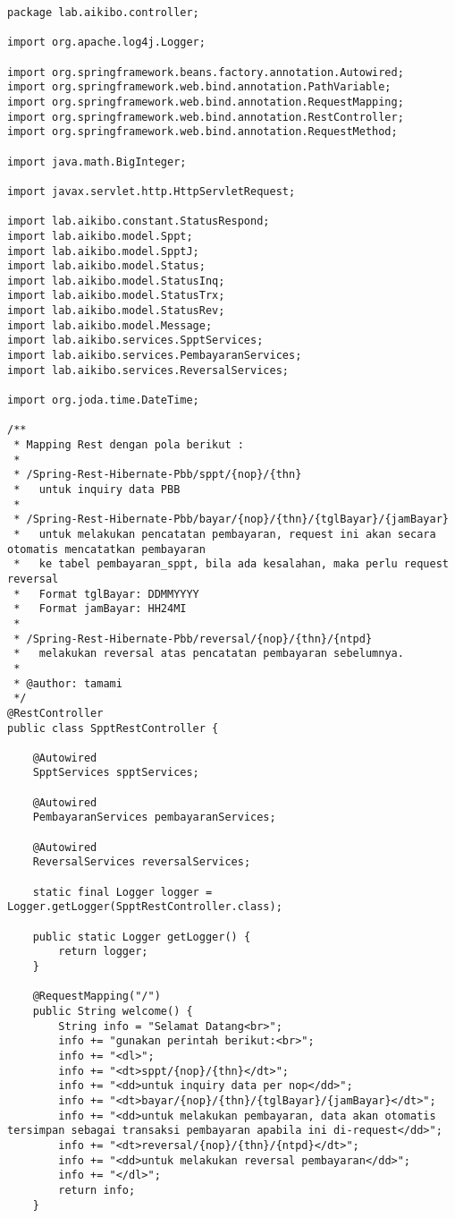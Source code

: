 \documentclass[pdftex,12pt, oneside]{article}
\begin{document}
\begin{lstlisting}
package lab.aikibo.controller;

import org.apache.log4j.Logger;

import org.springframework.beans.factory.annotation.Autowired;
import org.springframework.web.bind.annotation.PathVariable;
import org.springframework.web.bind.annotation.RequestMapping;
import org.springframework.web.bind.annotation.RestController;
import org.springframework.web.bind.annotation.RequestMethod;

import java.math.BigInteger;

import javax.servlet.http.HttpServletRequest;

import lab.aikibo.constant.StatusRespond;
import lab.aikibo.model.Sppt;
import lab.aikibo.model.SpptJ;
import lab.aikibo.model.Status;
import lab.aikibo.model.StatusInq;
import lab.aikibo.model.StatusTrx;
import lab.aikibo.model.StatusRev;
import lab.aikibo.model.Message;
import lab.aikibo.services.SpptServices;
import lab.aikibo.services.PembayaranServices;
import lab.aikibo.services.ReversalServices;

import org.joda.time.DateTime;

/**
 * Mapping Rest dengan pola berikut :
 *
 * /Spring-Rest-Hibernate-Pbb/sppt/{nop}/{thn}
 *   untuk inquiry data PBB
 *
 * /Spring-Rest-Hibernate-Pbb/bayar/{nop}/{thn}/{tglBayar}/{jamBayar}
 *   untuk melakukan pencatatan pembayaran, request ini akan secara otomatis mencatatkan pembayaran
 *   ke tabel pembayaran_sppt, bila ada kesalahan, maka perlu request reversal
 *   Format tglBayar: DDMMYYYY
 *   Format jamBayar: HH24MI
 *
 * /Spring-Rest-Hibernate-Pbb/reversal/{nop}/{thn}/{ntpd}
 *   melakukan reversal atas pencatatan pembayaran sebelumnya.
 *
 * @author: tamami
 */
@RestController
public class SpptRestController {

	@Autowired
	SpptServices spptServices;

	@Autowired
	PembayaranServices pembayaranServices;

	@Autowired
	ReversalServices reversalServices;

	static final Logger logger = Logger.getLogger(SpptRestController.class);

	public static Logger getLogger() {
		return logger;
	}

	@RequestMapping("/")
	public String welcome() {
		String info = "Selamat Datang<br>";
		info += "gunakan perintah berikut:<br>";
		info += "<dl>";
		info += "<dt>sppt/{nop}/{thn}</dt>";
		info += "<dd>untuk inquiry data per nop</dd>";
		info += "<dt>bayar/{nop}/{thn}/{tglBayar}/{jamBayar}</dt>";
		info += "<dd>untuk melakukan pembayaran, data akan otomatis tersimpan sebagai transaksi pembayaran apabila ini di-request</dd>";
		info += "<dt>reversal/{nop}/{thn}/{ntpd}</dt>";
		info += "<dd>untuk melakukan reversal pembayaran</dd>";
		info += "</dl>";
		return info;
	}


\end{lstlisting}
\end{document}
